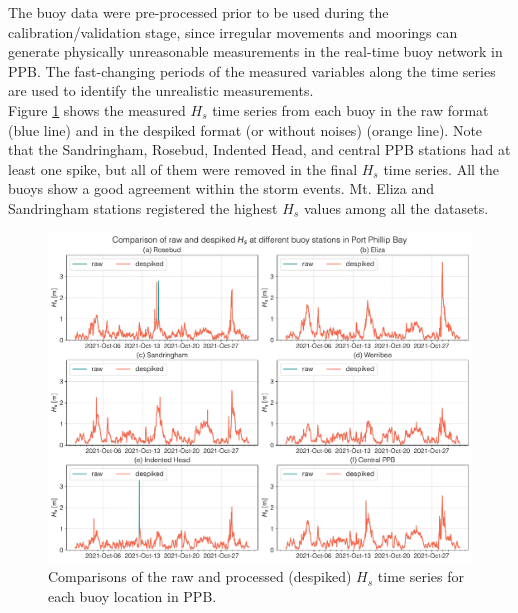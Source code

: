 \documentclass[12pt]{article}
\begin{document}
The buoy data were pre-processed prior to be used during the calibration/validation stage, since irregular movements and moorings can generate physically unreasonable measurements in the real-time buoy network in PPB. The fast-changing periods of the measured variables along the time series are used to identify the unrealistic measurements.\\

Figure \ref{fig:pre_processing} shows the  measured $H_{s}$ time series  from each buoy in the raw format (blue line) and in the despiked format (or without noises) (orange line). Note that the Sandringham, Rosebud, Indented Head, and central PPB stations had at least one spike, but all of them were removed in the final $H_{s}$ time series.  All the buoys show a good agreement within the storm events. Mt. Eliza and Sandringham stations registered the highest $H_{s}$ values among all the datasets.

\begin{figure}[h]
    \centering
    \includegraphics[scale=0.45]{plots/maps/buoy_despiked.pdf}
    \caption{Comparisons of the raw and processed (despiked) $H_{s}$ time series for each buoy location in PPB.}
    \label{fig:pre_processing}
\end{figure}

\end{document}
